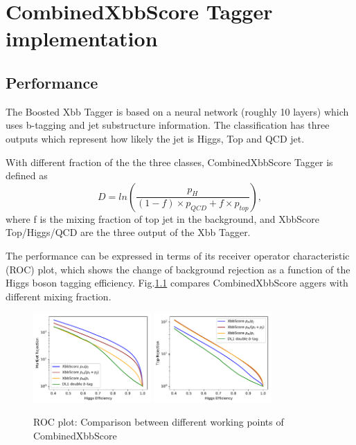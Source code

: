 \chapter{CombinedXbbScore Tagger implementation}

\section{Performance}

\par The Boosted Xbb Tagger is based on a neural network (roughly 10 layers) which uses b-tagging and jet substructure information. 
The classification has three outputs which represent how likely the jet is Higgs, Top and QCD jet.  

\par With different fraction of the the three classes, CombinedXbbScore Tagger is defined as
\begin{equation}
D=ln(\frac{p_H}{(1-f)\times p_{QCD}+f\times p_{top}}),
\end{equation}
where f is the mixing fraction of top jet in the background, and XbbScore Top/Higgs/QCD are the three output of the Xbb Tagger.

\par The performance can be expressed in terms of its receiver operator characteristic (ROC) plot, which shows the change of background rejection as a function of the Higgs boson tagging efficiency. 
Fig.\ref{fig:roctop} compares CombinedXbbScore aggers with different mixing fraction.

\begin{figure}[h]
    \centering
    \includegraphics[width=0.4\textwidth]{appendices/figures/roc_multijet.pdf}
    \includegraphics[width=0.4\textwidth]{appendices/figures/roc_top.pdf}
    \caption{ ROC plot: Comparison between different working points of CombinedXbbScore}
    \label{fig:roctop}
\end{figure}

